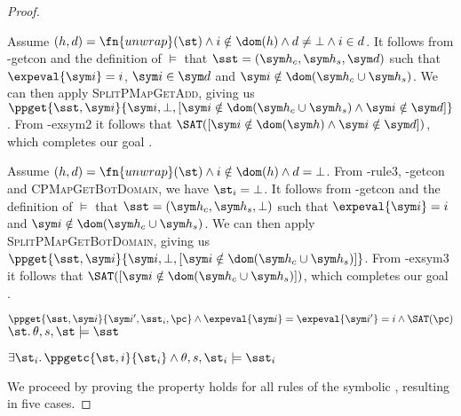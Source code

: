 \begin{proof}

\begin{hypvlist}
 Assume $(h,d)=\fn{unwrap}(\st) \land i\notin\dom(h) \land d\neq\bot \land i\in d$.
 It follows from \hyp{getcon} and the definition of $\models$ that $\sst=(\sym h_c, \sym h_s, \sym d)$ such that $\expeval{\sym i}=i$, $\sym i\in \sym d$ and $\sym i\notin \dom(\sym h_c \cup \sym h_s)$.
 We can then apply \textsc{SplitPMapGetAdd}, giving us $\ppget{\sst,\sym i}{\sym i,\bot,[\sym i\notin \dom(\sym h_c \cup \sym h_s) \land \sym i\notin \sym d]}$.%
 From \hyp{exsym2} it follows that $\SAT([\sym i\notin \dom(\sym h) \land \sym i\notin \sym d])$, which completes our goal .
\end{hypvlist}


\begin{hypvlist}
 Assume $(h,d)=\fn{unwrap}(\st) \land i\notin\dom(h) \land d=\bot$.
 From \hyp{rule3}, \hyp{getcon} and \textsc{CPMapGetBotDomain}, we have $\st_i=\bot$.
 It follows from \hyp{getcon} and the definition of $\models$ that $\sst=(\sym h_c, \sym h_s, \bot)$ such that $\expeval{\sym i}=i$ and $\sym i\notin \dom(\sym h_c\cup \sym h_s)$.
 We can then apply \textsc{SplitPMapGetBotDomain}, giving us ${\ppget{\sst,\sym i}{\sym i,\bot,[\sym i\notin \dom(\sym h_c\cup \sym h_s)]}}$.%
 From \hyp{exsym3} it follows that $\SAT([\sym i\notin \dom(\sym h_c\cup\sym h_s)])$, which completes our goal .
\end{hypvlist}


\pfassume \begin{hypvlist}
 $\ppget{\sst,\sym i}{\sym i', \sst_i, \pc} \land \expeval{\sym i}=\expeval{\sym i'}=i \land \SAT(\pc) $
 $\st\ldotp \theta,s,\st \models \sst$
\end{hypvlist}
\pfprove \begin{goalvlist}
 $\exists \st_i \ldotp \ppgetc{\st, i}{\st_i} \land \theta,s,\st_i \models \sst_i$
\end{goalvlist}

We proceed by proving the property holds for all rules of the symbolic , resulting in five cases.



\end{proof}
